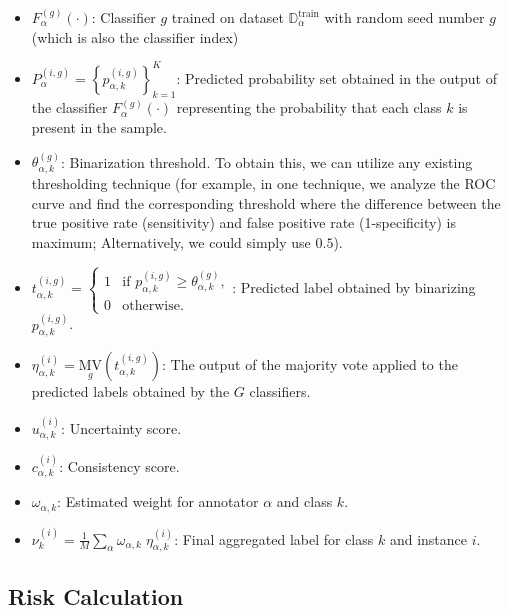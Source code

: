 \begin{itemize}[itemsep=1em]
    \item  $F_{\alpha}^{(g)}(\cdot)$: Classifier $g $ trained on dataset $\mathbb{D}_{\alpha}^{\mathrm{train}} $ with random seed number $g $ (which is also the classifier index)

    \item  $P_{\alpha}^{(i,g)} = {\left\{ p_{\alpha,k}^{(i,g)} \right\}}_{k=1}^{K} $: Predicted probability set obtained in the output of the classifier $F_{\alpha}^{(g)}(\cdot) $ representing the probability that each class $k $ is present in the sample.

    \item  $\theta_{\alpha,k}^{(g)} $: Binarization threshold. To obtain this, we can utilize any existing thresholding technique (for example, in one technique, we analyze the ROC curve and find the corresponding threshold where the difference between the true positive rate (sensitivity) and false positive rate (1-specificity) is maximum; Alternatively, we could simply use $0.5 $).

    \item  $t_{\alpha,k}^{(i,g)} =
        \begin{cases}
            1 & \text{if } p_{\alpha,k}^{(i,g)} \geq \theta_{\alpha,k}^{(g)}, \\
            0 & \text{otherwise}.
        \end{cases} $: Predicted label obtained by binarizing $p_{\alpha,k}^{(i,g)} $.

    \item  $\eta_{\alpha,k}^{(i)} = {{\underset g{\mathrm{MV}}}{ \left(t_{\alpha,k}^{(i,g)}\right) }} $: The output of the majority vote applied to the predicted labels obtained by the $G $ classifiers.

    \item  $u_{\alpha,k}^{(i)} $: Uncertainty score.

    \item  $c_{\alpha,k}^{(i)} $: Consistency score.

    \item  $\omega_{\alpha,k} $: Estimated weight for annotator $\alpha $ and class $k $.

    \item  $\nu_k^{(i)}=\frac{1}{{M}}{\sum_{\alpha}{\omega_{\alpha,k} \; \eta_{\alpha,k}^{(i)}}} $: Final aggregated label for class $k $ and instance $i $.

\end{itemize}

\subsection{Risk Calculation}


